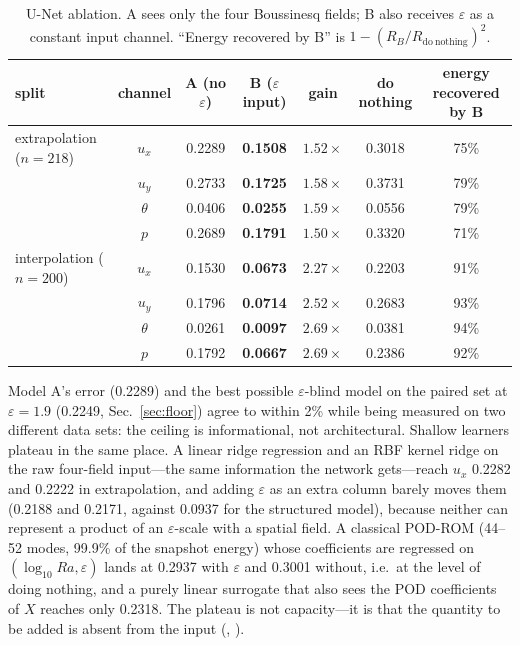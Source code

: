 \documentclass[11pt,a4paper]{article}
\begin{document}
\begin{table}[htbp]
\centering
\footnotesize
\setlength{\tabcolsep}{4pt}
\caption{U-Net ablation. A sees only the four Boussinesq fields; B also receives $\varepsilon$ as a
constant input channel. ``Energy recovered by B'' is $1-(R_B/R_{\mathrm{do\ nothing}})^2$.}
\label{tab:baselines}
\begin{tabular}{@{}p{4.2cm}cccccc@{}}
\toprule
split & channel & A (no $\varepsilon$) & B ($\varepsilon$ input) & gain & do nothing &
energy recovered by B\\
\midrule
extrapolation ($n=218$) & $u_x$ & 0.2289 & \textbf{0.1508} & $1.52\times$ & 0.3018 & 75\%\\
 & $u_y$ & 0.2733 & \textbf{0.1725} & $1.58\times$ & 0.3731 & 79\%\\
 & $\theta$ & 0.0406 & \textbf{0.0255} & $1.59\times$ & 0.0556 & 79\%\\
 & $p$ & 0.2689 & \textbf{0.1791} & $1.50\times$ & 0.3320 & 71\%\\
interpolation ($n=200$) & $u_x$ & 0.1530 & \textbf{0.0673} & $2.27\times$ & 0.2203 & 91\%\\
 & $u_y$ & 0.1796 & \textbf{0.0714} & $2.52\times$ & 0.2683 & 93\%\\
 & $\theta$ & 0.0261 & \textbf{0.0097} & $2.69\times$ & 0.0381 & 94\%\\
 & $p$ & 0.1792 & \textbf{0.0667} & $2.69\times$ & 0.2386 & 92\%\\
\bottomrule
\end{tabular}
\end{table}

Model A's error (0.2289) and the best possible $\varepsilon$-blind model on the paired set at
$\varepsilon=1.9$ (0.2249, Sec.~\ref{sec:floor}) agree to within 2\% while being measured on two
different data sets: the ceiling is informational, not architectural. Shallow learners plateau in
the same place. A linear ridge regression and an RBF kernel ridge on the raw four-field
input---the same information the network gets---reach $u_x$ 0.2282 and 0.2222 in extrapolation, and
adding $\varepsilon$ as an extra column barely moves them (0.2188 and 0.2171, against 0.0937 for
the structured model), because neither can represent a product of an $\varepsilon$-scale with a
spatial field. A classical POD-ROM (44--52 modes, 99.9\% of the snapshot energy) whose coefficients
are regressed on $(\log_{10}Ra,\varepsilon)$ lands at 0.2937 with $\varepsilon$ and 0.3001 without,
i.e.\ at the level of doing nothing, and a purely linear surrogate that also sees the POD
coefficients of $X$ reaches only 0.2318. The plateau is not capacity---it is that the quantity to be
added is absent from the input (, ).
\end{document}
